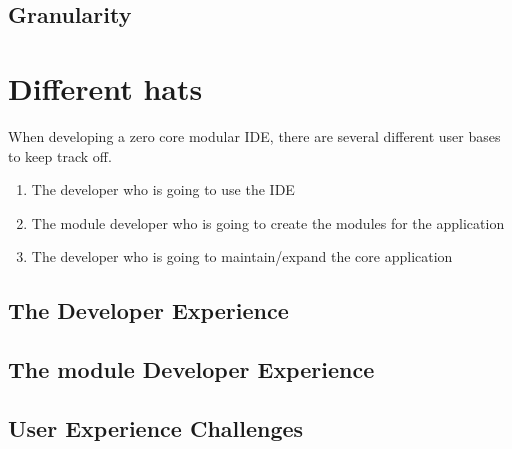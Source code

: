 \documentclass[runningheads]{llncs}
\begin{document}
\subsection{Granularity}

\section{Different hats}
When developing a zero core modular IDE, there are several different user bases
to keep track off.

\begin{enumerate}
  \item The developer who is going to use the IDE
  \item The module developer who is going to create the modules for the application
  \item The developer who is going to maintain/expand the core application
\end{enumerate}

\subsection{The Developer Experience}
\subsection{The module Developer Experience}
\subsection{User Experience Challenges}
\end{document}
